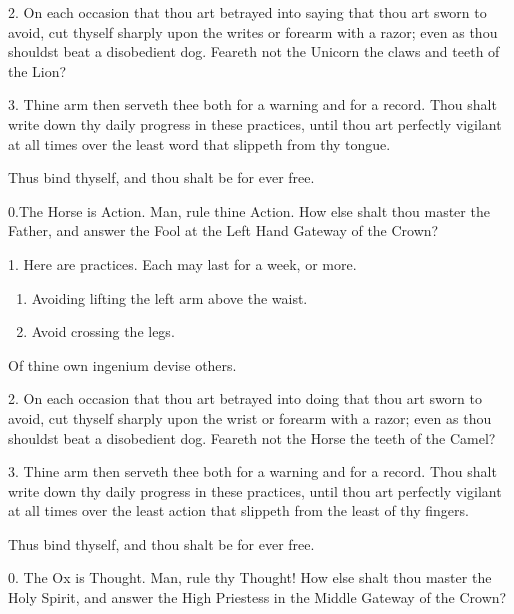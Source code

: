 2. On each occasion that thou art betrayed into saying that thou art sworn to avoid, cut thyself sharply upon the writes or forearm with a razor; even as thou shouldst beat a disobedient dog. Feareth not the Unicorn the claws and teeth of the Lion?

3. Thine arm then serveth thee both for a warning and for a record. Thou shalt write down thy daily progress in these practices, until thou art perfectly vigilant at all times over the least word that slippeth from thy tongue.

Thus bind thyself, and thou shalt be for ever free.

0.The Horse is Action. Man, rule thine Action. How else shalt thou master the Father, and answer the Fool at the Left Hand Gateway of the Crown?

1. Here are practices. Each may last for a week, or more.

\begin{enumerate}[label=\greek*.]
\item Avoiding lifting the left arm above the waist.

\item Avoid crossing the legs.
\end{enumerate}

Of thine own ingenium devise others.

2. On each occasion that thou art betrayed into doing that thou art sworn to avoid, cut thyself sharply upon the wrist or forearm with a razor; even as thou shouldst beat a disobedient dog. Feareth not the Horse the teeth of the Camel?

3. Thine arm then serveth thee both for a warning and for a record. Thou shalt write down thy daily progress in these practices, until thou art perfectly vigilant at all times over the least action that slippeth from the least of thy fingers.

Thus bind thyself, and thou shalt be for ever free.

0. The Ox is Thought. Man, rule thy Thought! How else shalt thou master the Holy Spirit, and answer the High Priestess in the Middle Gateway of the Crown?

